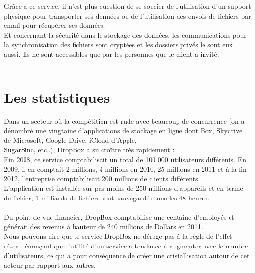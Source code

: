 \documentclass[a4paper, 10pt]{article}
\begin{document}
\newpage
\noindent
Gr\^ace \`a ce service, il n'est plus question de se soucier de l'utilisation d'un support physique pour transporter ses donn\'ees
ou de l'utilisation des envois de fichiers par email pour r\'ecup\'erer ses donn\'ees.\\
Et concernant la s\'ecurit\'e dans le stockage des donn\'ees, les communications pour la synchronisation des fichiers sont crypt\'ees et
les dossiers priv\'es le sont eux aussi. Ils ne sont accessibles que par les personnes que le client a invit\'e.\\ \\

\section*{Les statistiques}
Dans un secteur o\`u la comp\'etition est rude avec beaucoup de concurrence
(on a d\'enombr\'e une vingtaine d'applications de stockage en ligne dont Box, Skydrive de Microsoft, Google Drive, iCloud d'Apple,\\SugarSinc,
etc..), DropBox a su cro\^itre tr\`es rapidement :\\
Fin 2008, ce service comptabilisait un total de 100 000 utilisateurs diff\'erents.
En 2009, il en comptait 2 millions, 4 millions en 2010, 25 millions en 2011 et
\`a la fin 2012, l'entreprise comptabilisait 200 millions de clients diff\'erents.\\
L'application est install\'ee sur pas moins de 250 millions d'appareils et
en terme de fichier, 1 milliards de fichiers sont sauvegard\'es tous les 48 heures.\\ \\
Du point de vue financier, DropBox comptabilise une centaine d'employ\'es et g\'en\'erait des revenus \`a hauteur
de 240 millions de Dollars en 2011.\\
Nous pouvons dire que le service DropBox ne d\'eroge pas \`a la r\`egle de l'effet r\'eseau \'enonçant que l'utilit\'e d'un service
a tendance \`a augmenter avec le nombre d'utilisateurs, ce qui a pour cons\'equence de cr\'eer une cristallisation autour de cet acteur
par rapport aux autres.\\ \\
\end{document}
